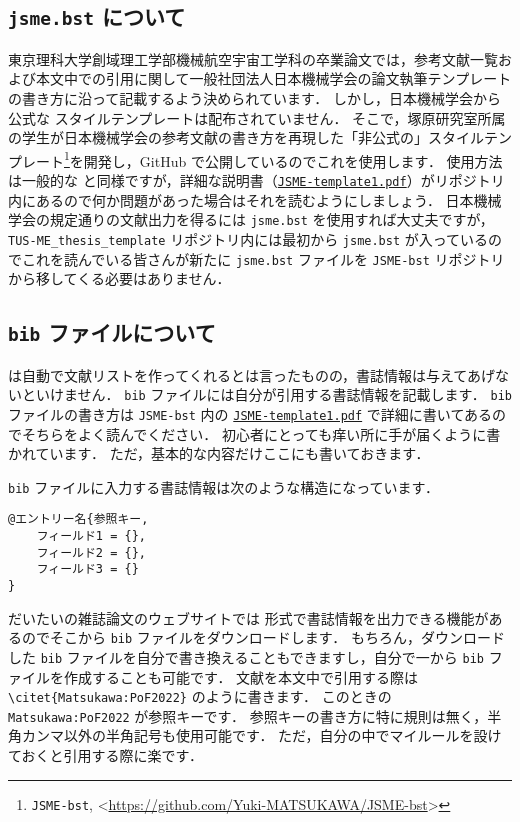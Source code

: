\subsection{\texttt{jsme.bst} について}
\label{ssec:jsme-bst}

東京理科大学創域理工学部機械航空宇宙工学科の卒業論文では，参考文献一覧および本文中での引用に関して一般社団法人日本機械学会の論文執筆テンプレートの書き方に沿って記載するよう決められています．
しかし，日本機械学会から公式な \BibTeX スタイルテンプレートは配布されていません．
そこで，塚原研究室所属の学生が日本機械学会の参考文献の書き方を再現した「非公式の」\BibTeX スタイルテンプレート\footnote{\texttt{JSME-bst}, \textless\url{https://github.com/Yuki-MATSUKAWA/JSME-bst}\textgreater}を開発し，GitHub で公開しているのでこれを使用します．
使用方法は一般的な \BibTeX と同様ですが，詳細な説明書（\href{https://github.com/Yuki-MATSUKAWA/JSME-bst/blob/main/JSME-template1.pdf}{\texttt{JSME-template1.pdf}}）がリポジトリ内にあるので何か問題があった場合はそれを読むようにしましょう．
日本機械学会の規定通りの文献出力を得るには \verb|jsme.bst| を使用すれば大丈夫ですが，\verb|TUS-ME_thesis_template| リポジトリ内には最初から \verb|jsme.bst| が入っているのでこれを読んでいる皆さんが新たに \verb|jsme.bst| ファイルを \verb|JSME-bst| リポジトリから移してくる必要はありません．

\subsection{\texttt{bib} ファイルについて}
\label{ssec:bib-file}

\BibTeX は自動で文献リストを作ってくれるとは言ったものの，書誌情報は与えてあげないといけません．
\verb|bib| ファイルには自分が引用する書誌情報を記載します．
\verb|bib| ファイルの書き方は \verb|JSME-bst| 内の \href{https://github.com/Yuki-MATSUKAWA/JSME-bst/blob/main/JSME-template1.pdf}{\texttt{JSME-template1.pdf}} で詳細に書いてあるのでそちらをよく読んでください．
\BibTeX 初心者にとっても痒い所に手が届くように書かれています．
ただ，基本的な内容だけここにも書いておきます．

\verb|bib| ファイルに入力する書誌情報は次のような構造になっています．
\begin{tcolorbox}[enhanced, title={\texttt{bib} ファイル内の書誌情報の構造}, drop fuzzy shadow]
\begin{verbatim}
@エントリー名{参照キー,
    フィールド1 = {},
    フィールド2 = {},
    フィールド3 = {}
}
\end{verbatim}
\end{tcolorbox}
\noindent
だいたいの雑誌論文のウェブサイトでは \BibTeX 形式で書誌情報を出力できる機能があるのでそこから \verb|bib| ファイルをダウンロードします．
もちろん，ダウンロードした \verb|bib| ファイルを自分で書き換えることもできますし，自分で一から \verb|bib| ファイルを作成することも可能です．
文献を本文中で引用する際は \verb|\citet{Matsukawa:PoF2022}| のように書きます．
このときの \verb|Matsukawa:PoF2022| が参照キーです．
参照キーの書き方に特に規則は無く，半角カンマ以外の半角記号も使用可能です．
ただ，自分の中でマイルールを設けておくと引用する際に楽です．

